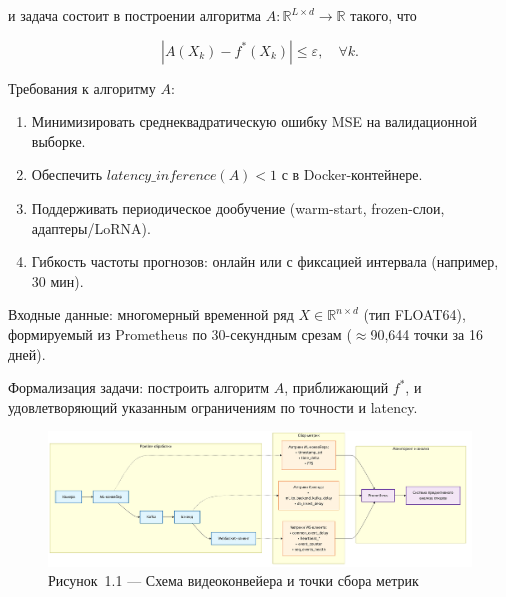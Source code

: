 и задача состоит в построении алгоритма $A: \mathbb{R}^{L \times d} \to \mathbb{R}$ такого, что

\begin{equation}
	|A(X_k) - f^*(X_k)| \le \varepsilon,\quad \forall k.
\end{equation}

Требования к алгоритму $A$:

\begin{enumerate}
	\item Минимизировать среднеквадратическую ошибку MSE на валидационной выборке.
	\item Обеспечить $latency\_inference(A) < 1$ с в Docker-контейнере.
	\item Поддерживать периодическое дообучение (warm-start, frozen-слои, адаптеры/LoRNA).
	\item Гибкость частоты прогнозов: онлайн или с фиксацией интервала (например, 30 мин).
\end{enumerate}

Входные данные: многомерный временной ряд $X \in \mathbb{R}^{n \times d}$ (тип FLOAT64), формируемый из Prometheus по 30-секундным срезам ($\approx$90,644 точки за 16 дней).

Формализация задачи: построить алгоритм $A$, приближающий $f^*$, и удовлетворяющий указанным ограничениям по точности и latency.

\begin{landscape}
\vspace*{\fill}
\begin{figure}[H]
	\centering
	\includegraphics[width=\linewidth,height=\textheight,keepaspectratio]{figures/chapter1/video_pipeline_diagram.png}
	\caption*{Рисунок~1.1 --- Схема видеоконвейера и точки сбора метрик}
	\label{fig:video_pipeline}
\end{figure}
\vspace*{\fill}
\end{landscape}
